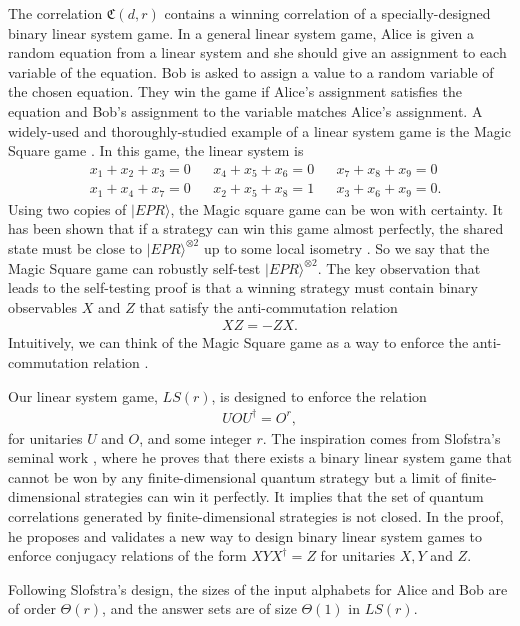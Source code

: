 \documentclass[11pt,letterpaper]{article}
\newcommand{\ket}[1]{|#1\rangle}
\newcommand{\x}{\otimes}
\newcommand{\ct}{^{\dagger}}
\newcommand{\1}{\mathbb{1}}
\newcommand{\LS}{LS}
\newcommand{\fC}{\mathfrak{C}}
\theoremstyle{definition}
\begin{document}
The correlation $\fC(d,r)$ contains a winning correlation of a specially-designed binary linear system game.
In a general linear system game, Alice is given a random equation 
from a linear system and she
should give an assignment to each variable of the equation.
Bob is asked to assign a value to a random variable of the chosen equation.
They win the game if Alice's assignment satisfies the equation and Bob's
assignment to the variable matches Alice's assignment.
A widely-used and thoroughly-studied example of a linear system game is
the Magic Square game \cite{magic_square}.
In this game, the linear system is
\begin{align*}
    &x_1 + x_2 + x_3 = 0 && x_4 + x_5 + x_6 = 0 &&
    x_7 + x_8 + x_9 = 0 \\
    &x_1 + x_4 + x_7 = 0 && x_2 + x_5 + x_8 = 1 &&
    x_3 + x_6 + x_9 = 0.
\end{align*}
Using two copies of $\ket{EPR}$,
the Magic square game can be won with certainty.
It has been shown that if a strategy can win this game almost perfectly, 
the shared state must be close to $\ket{EPR}^{\x 2}$ up to some local isometry \cite{wu2016}.
So we say that the Magic Square game can robustly self-test $\ket{EPR}^{\x 2}$.
The key observation that leads to the self-testing proof is that 
a winning strategy must contain binary observables $X$ and $Z$ that 
satisfy the anti-commutation relation 
\begin{align*}
    X Z = - Z X.
\end{align*}
Intuitively, we can think of the Magic Square game as a way to enforce the
anti-commutation relation \cite{coladan2017}.

Our linear system game, $\LS(r)$, is designed to enforce the relation 
\begin{align}
\label{eq:uor}
    U O U\ct = O^r,
\end{align}
for unitaries $U$ and $O$, and some integer $r$.
The inspiration comes from Slofstra's seminal work \cite{slofstra2017},
where he proves that 
there exists a binary linear system game that cannot be won by 
any finite-dimensional quantum strategy but a limit of 
finite-dimensional strategies can win it perfectly.
It implies that the set of quantum correlations generated by
finite-dimensional strategies is not closed.
In the proof, he proposes and validates a new way 
to design binary linear system games to enforce conjugacy relations of the
form $X Y X\ct = Z$ for unitaries $X, Y$ and $Z$.

Following Slofstra's design, 
the sizes of the input alphabets for Alice and Bob are of order $\Theta(r)$,
and the answer sets are of size $\Theta(1)$ in $\LS(r)$.
\end{document}
